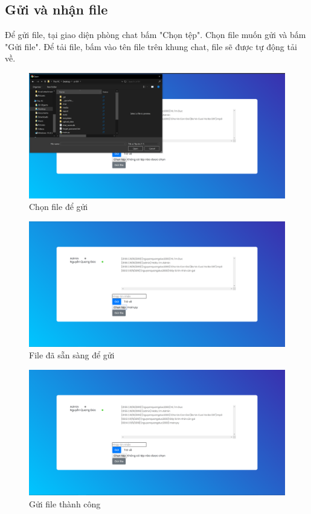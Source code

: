 \documentclass[a4paper]{article}
\begin{document}
	\subsection{Gửi và nhận file}
	Để gửi file, tại giao diện phòng chat bấm "Chọn tệp". Chọn file muốn gửi và bấm "Gửi file".\linebreak
	Để tải file, bấm vào tên file trên khung chat, file sẽ được tự động tải về.
	
	\begin{figure}[H]
		\centering
		\includegraphics[scale=0.36]{send_file.png}
		\caption{Chọn file để gửi}
		\label{F:send_file}
	\end{figure}
	
	\begin{figure}[H]
		\centering
		\includegraphics[scale=0.36]{send_file_prepare.png}
		\caption{File đã sẵn sàng để gửi}
		\label{F:send_file_prepare}
	\end{figure}
	
	\begin{figure}[H]
		\centering
		\includegraphics[scale=0.36]{send_file_success.png}
		\caption{Gửi file thành công}
		\label{F:send_file_success}
	\end{figure}
	
\end{document}

